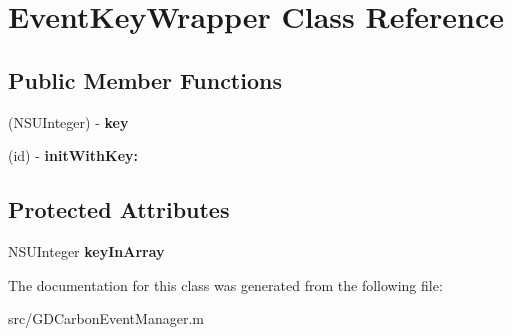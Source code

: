 \hypertarget{interface_event_key_wrapper}{
\section{EventKeyWrapper Class Reference}
\label{interface_event_key_wrapper}
}
\subsection*{Public Member Functions}
\begin{DoxyCompactItemize}
\item 
\hypertarget{interface_event_key_wrapper_aadb96c3d2f22a762e63bf6c3f6362e17}{
(NSUInteger) -\/ {\bfseries key}}
\label{interface_event_key_wrapper_aadb96c3d2f22a762e63bf6c3f6362e17}

\item 
\hypertarget{interface_event_key_wrapper_ab2ed0afe2d80835ca02187c59315159d}{
(id) -\/ {\bfseries initWithKey:}}
\label{interface_event_key_wrapper_ab2ed0afe2d80835ca02187c59315159d}

\end{DoxyCompactItemize}
\subsection*{Protected Attributes}
\begin{DoxyCompactItemize}
\item 
\hypertarget{interface_event_key_wrapper_afe7c15f44098176f90f28812bfdb810f}{
NSUInteger {\bfseries keyInArray}}
\label{interface_event_key_wrapper_afe7c15f44098176f90f28812bfdb810f}

\end{DoxyCompactItemize}


The documentation for this class was generated from the following file:\begin{DoxyCompactItemize}
\item 
src/GDCarbonEventManager.m\end{DoxyCompactItemize}

